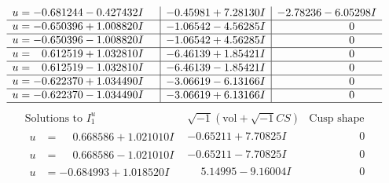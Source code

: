 \documentclass[1p]{elsarticle_modified}
\theoremstyle{definition}
\newcommand{\I}{\sqrt{-1}}
\begin{document}
$$\begin{array}{c|c|c}
\begin{aligned}
u &= -0.681244 - 0.427432 I\end{aligned}
 & -0.45981 + 7.28130 I & -2.78236 - 6.05298 I \\ \hline\begin{aligned}
u &= -0.650396 + 1.008820 I\end{aligned}
 & -1.06542 - 4.56285 I & \phantom{-0.000000 } 0 \\ \hline\begin{aligned}
u &= -0.650396 - 1.008820 I\end{aligned}
 & -1.06542 + 4.56285 I & \phantom{-0.000000 } 0 \\ \hline\begin{aligned}
u &= \phantom{-}0.612519 + 1.032810 I\end{aligned}
 & -6.46139 + 1.85421 I & \phantom{-0.000000 } 0 \\ \hline\begin{aligned}
u &= \phantom{-}0.612519 - 1.032810 I\end{aligned}
 & -6.46139 - 1.85421 I & \phantom{-0.000000 } 0 \\ \hline\begin{aligned}
u &= -0.622370 + 1.034490 I\end{aligned}
 & -3.06619 - 6.13166 I & \phantom{-0.000000 } 0 \\ \hline\begin{aligned}
u &= -0.622370 - 1.034490 I\end{aligned}
 & -3.06619 + 6.13166 I & \phantom{-0.000000 } 0\\
 \hline 
 \end{array}$$\newpage$$\begin{array}{c|c|c}  
\text{Solutions to }I^u_{1}& \I (\text{vol} + \sqrt{-1}CS) & \text{Cusp shape}\\
 \hline 
\begin{aligned}
u &= \phantom{-}0.668586 + 1.021010 I\end{aligned}
 & -0.65211 + 7.70825 I & \phantom{-0.000000 } 0 \\ \hline\begin{aligned}
u &= \phantom{-}0.668586 - 1.021010 I\end{aligned}
 & -0.65211 - 7.70825 I & \phantom{-0.000000 } 0 \\ \hline\begin{aligned}
u &= -0.684993 + 1.018520 I\end{aligned}
 & \phantom{-}5.14995 - 9.16004 I & \phantom{-0.000000 } 0 \\ \hline\begin{aligned}

\end{aligned}
\end{array}$$
\end{document}
